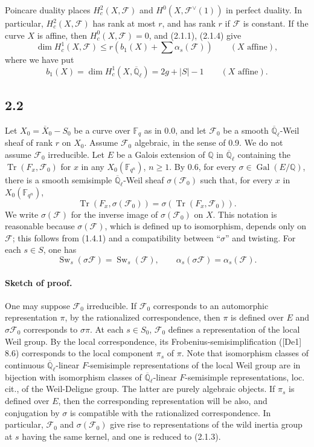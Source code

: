 \documentclass[11pt]{article}
\newcommand{\F}{\mathbb{F}}
\newcommand{\Q}{\mathbb{Q}}
\newcommand{\Ql}{\overline{\mathbb Q}_{\ell}}
\newcommand{\Tr}{\operatorname{Tr}}
\newcommand{\Gal}{\operatorname{Gal}}
\newcommand{\Sw}{\operatorname{Sw}}
\begin{document}
Poincare duality places $H^2_c(X,\mathcal F)$ and $H^0(X,\mathcal F^\vee(1))$ in perfect duality.
In particular, $H^2_c(X,\mathcal F)$ has rank at most $r$, and has rank $r$ if $\mathcal F$ is constant.
If the curve $X$ is affine, then $H^0_c(X,\mathcal F)=0$, and (2.1.1), (2.1.4) give
\begin{equation}
 \dim H^1_c(X,\mathcal F)\le r\left(b_1(X)+\sum \alpha_s(\mathcal F)\right)\qquad (X\text{ affine}),
\tag{2.1.6}
\end{equation}
where we have put
\begin{equation}
 b_1(X)=\dim H^1_c(X,\Ql)=2g+|S|-1\qquad (X\text{ affine}).
\tag{2.1.7}
\end{equation}

\subsection*{2.2}
Let $X_0=\overline X_0-S_0$ be a curve over $\F_q$ as in 0.0, and let $\mathcal F_0$ be a smooth $\Ql$-Weil sheaf of rank $r$ on $X_0$.
Assume $\mathcal F_0$ algebraic, in the sense of 0.9.
We do not assume $\mathcal F_0$ irreducible.
Let $E$ be a Galois extension of $\Q$ in $\Ql$ containing the $\Tr(F_x,\mathcal F_0)$ for $x$ in any $X_0(\F_{q^n})$, $n\ge1$.
By 0.6, for every $\sigma\in\Gal(E/\Q)$, there is a smooth semisimple $\Ql$-Weil sheaf $\sigma(\mathcal F_0)$ such that, for every $x$ in $X_0(\F_{q^n})$,
\[
 \Tr(F_x,\sigma(\mathcal F_0))=\sigma(\Tr(F_x,\mathcal F_0)).
\]
We write $\sigma(\mathcal F)$ for the inverse image of $\sigma(\mathcal F_0)$ on $X$.
This notation is reasonable because $\sigma(\mathcal F)$, which is defined up to isomorphism, depends only on $\mathcal F$; this follows from (1.4.1) and a compatibility between ``$\sigma$'' and twisting.
For each $s\in S$, one has
\begin{equation}
 \Sw_s(\sigma\mathcal F)=\Sw_s(\mathcal F),\qquad
 \alpha_s(\sigma\mathcal F)=\alpha_s(\mathcal F).
\tag{2.2.1}
\end{equation}

\paragraph{Sketch of proof.}
One may suppose $\mathcal F_0$ irreducible.
If $\mathcal F_0$ corresponds to an automorphic representation $\pi$, by the rationalized correspondence, then $\pi$ is defined over $E$ and $\sigma\mathcal F_0$ corresponds to $\sigma\pi$.
At each $s\in S_0$, $\mathcal F_0$ defines a representation of the local Weil group.
By the local correspondence, its Frobenius-semisimplification ([De1] 8.6) corresponds to the local component $\pi_s$ of $\pi$.
Note that isomorphism classes of continuous $\Ql$-linear $F$-semisimple representations of the local Weil group are in bijection with isomorphism classes of $\Ql$-linear $F$-semisimple representations, loc. cit., of the Weil-Deligne group.
The latter are purely algebraic objects.
If $\pi_s$ is defined over $E$, then the corresponding representation will be also, and conjugation by $\sigma$ is compatible with the rationalized correspondence.
In particular, $\mathcal F_0$ and $\sigma(\mathcal F_0)$ give rise to representations of the wild inertia group at $s$ having the same kernel, and one is reduced to (2.1.3).
\end{document}
